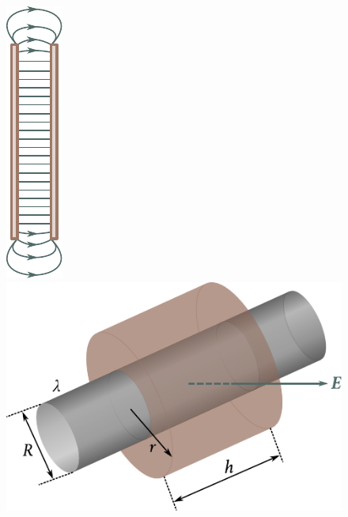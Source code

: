 \begin{figure}[!htb]
	\begin{minipage}[t]{0.35\linewidth}
		\begin{center}
			\includegraphics[scale=1]{figures/ch_01/fig_1_41.pdf}
			\caption[]{}
			\label{fig:1_41}
		\end{center}
	\end{minipage}
	\hspace{-0.05cm}
	\begin{minipage}[t]{0.65\linewidth}
		\begin{center}
			\includegraphics[scale=0.95]{figures/ch_01/fig_1_42.pdf}
			\caption[]{}
			\label{fig:1_42}
		\end{center}
	\end{minipage}
\vspace{-0.4cm}
\end{figure}

